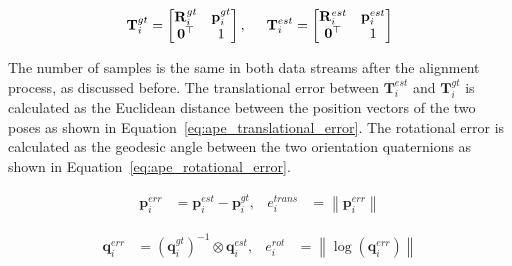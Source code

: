\documentclass[report.tex]{subfiles}
\begin{document}
    \begin{equation}
            \mathbf{T}^{gt}_i =
            \begin{bmatrix}
                \mathbf{R}^{gt}_i & \mathbf{p}^{gt}_i \\
                \mathbf{0}^\top & 1
            \end{bmatrix}, \hspace{0.5cm}
            \mathbf{T}^{est}_i =
            \begin{bmatrix}
                \mathbf{R}^{est}_i & \mathbf{p}^{est}_i \\
                \mathbf{0}^\top & 1
            \end{bmatrix}
    \label{eq:EstAndGtPose}
    \end{equation}
    
    The number of samples is the same in both data streams after the alignment process, as discussed before. The translational error between $\mathbf{T}^{est}_i$ and $\mathbf{T}^{gt}_i$ is calculated as the Euclidean distance between the position vectors of the two poses as shown in Equation~\ref{eq:ape_translational_error}. The rotational error is calculated as the geodesic angle between the two orientation quaternions as shown in Equation~\ref{eq:ape_rotational_error}.

    \begin{equation}
        \begin{aligned}
            \mathbf{p}_{i}^{err}
            &=
            \mathbf{p}^{est}_i - \mathbf{p}^{gt}_i,
            &
            e^{trans}_{i}
            &=
            \left\|
                \mathbf{p}_{i}^{err}
            \right\|
        \end{aligned}
        \label{eq:ape_translational_error}
    \end{equation}

    \begin{equation}
        \begin{aligned}
            \mathbf{q}_{i}^{err}
            &=
            \left(\mathbf{q}^{gt}_i\right)^{-1}
            \otimes
            \mathbf{q}^{est}_i,
            &
            e^{rot}_{i}
            &=
            \left\|
                \log
                \left(
                    \mathbf{q}_{i}^{err}
                \right)
            \right\|
        \end{aligned}
        \label{eq:ape_rotational_error}
    \end{equation}
    
\end{document}
